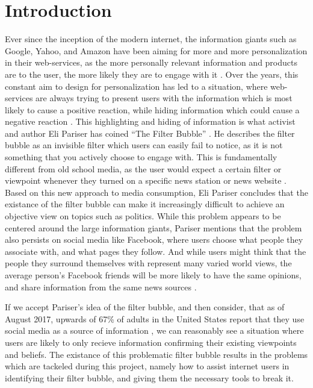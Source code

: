 \chapter{Introduction}\label{ch:intro}

Ever since the inception of the modern internet, the information giants such as
Google, Yahoo, and Amazon have been aiming for more and more personalization in
their web-services, as the more personally relevant information and products are
to the user, the more likely they are to engage with it 
\citep[p.7]{pariser2011filter}. Over the years, this constant aim to design for
personalization has led to a situation, where web-services are always trying to
present users with the information which is most likely to cause a positive
reaction, while hiding information which could cause a negative
reaction \citep{filterBubbleDef, Personality}. This highlighting and hiding of
information is what activist and author Eli Pariser has coined ``The Filter
Bubble'' \citep[p.9]{pariser2011filter}. He describes the filter bubble as an
invisible filter which users can easily fail to notice, as it is not something
that you actively choose to engage with. This is fundamentally different from
old school media, as the user would expect a certain filter or viewpoint
whenever they turned on a specific news station or news website
\citep[p.10]{pariser2011filter}. Based on this new approach to media
consumption, Eli Pariser concludes that the existance of the filter bubble can
make it increasingly difficult to achieve an objective view on topics such as
politics. While this problem appears to be centered around the large information
giants, Pariser mentions that the problem also persists on social media
like Facebook, where users choose what people they associate with, and what
pages they follow. And while users might think that the people they surround
themselves with represent many varied world views, the average person's Facebook
friends will be more likely to have the same opinions, and share
information from the same news sources \citep[p.66]{pariser2011filter}.\nl

If we accept Pariser's idea of the filter bubble, and then consider, that as of
August 2017, upwards of 67\% of adults in the United States report that they use
social media as a source of information \citep{journalism2017}, we can
reasonably see a situation where users are likely to only recieve information confirming
their existing viewpoints and beliefs. The existance of this problematic filter
bubble results in the problems which are tackeled during this project, namely
how to assist internet users in identifying their filter bubble, and giving them
the necessary tools to break it.



